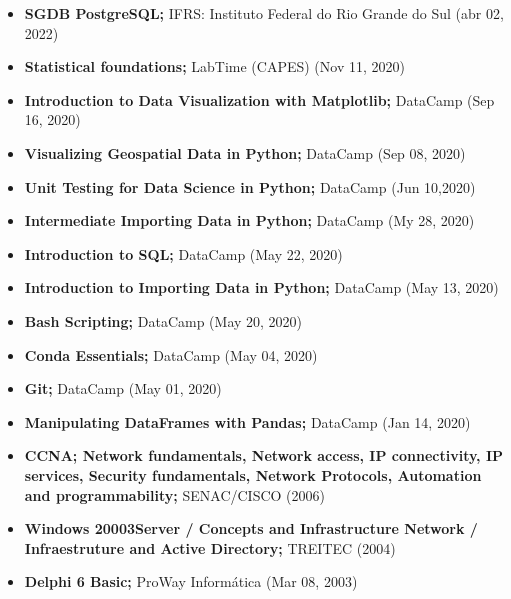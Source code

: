 \documentclass[9pt, green]{./template/developercv} %
\begin{document}
\begin{itemize}
    \item{\textbf{SGDB PostgreSQL;} IFRS: Instituto Federal do Rio Grande do Sul (abr 02, 2022)}
    
    \item{\textbf{Statistical foundations;} LabTime (CAPES) (Nov 11, 2020)}
    
    \item{\textbf{Introduction to Data Visualization with Matplotlib;} {DataCamp} (Sep 16, 2020)}
    
    \item{\textbf{Visualizing Geospatial Data in Python;} {DataCamp} (Sep 08, 2020)}
    
    \item{\textbf{Unit Testing for Data Science in Python;} {DataCamp} (Jun 10,2020)}
    
    \item{\textbf{Intermediate Importing Data in Python;} {DataCamp} (My 28, 2020)}
    
    \item{\textbf{Introduction to SQL;} {DataCamp} (May 22, 2020)}
    
    \item{\textbf{Introduction to Importing Data in Python;} {DataCamp} (May 13, 2020)}
    
    \item{\textbf{Bash Scripting;} {DataCamp} (May 20, 2020)}
    
    \item{\textbf{Conda Essentials;} {DataCamp} (May 04, 2020)}
    
    \item{\textbf{Git;} {DataCamp} (May 01, 2020)}
    
    \item{\textbf{Manipulating DataFrames with Pandas;} {DataCamp} (Jan 14, 2020)}
    
    \item{\textbf{CCNA; Network fundamentals, Network access, IP connectivity, IP services, Security fundamentals, Network Protocols, Automation and programmability;} {SENAC/CISCO} (2006)}
    
    \item{\textbf{Windows 20003Server / Concepts and Infrastructure Network / Infraestruture and Active Directory;} {TREITEC} {(2004)}}
    	
    \item{\textbf{Delphi 6 Basic;} {ProWay Informática} {(Mar 08, 2003)}}
\end{itemize}

\end{document}

